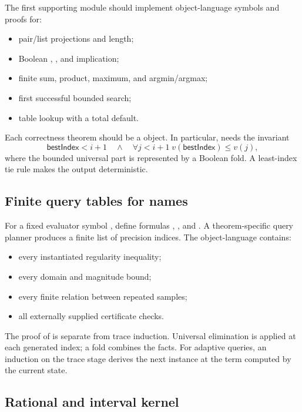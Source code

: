 The first supporting module should implement object-language symbols and
proofs for:
\begin{itemize}
\item pair/list projections and length;
\item Boolean , , and implication;
\item finite sum, product, maximum, and argmin/argmax;
\item first successful bounded search;
\item table lookup with a total default.
\end{itemize}

Each correctness theorem should be a  object.  In particular,
 needs the invariant
\[
 \mathsf{bestIndex}<i+1\quad\wedge\quad
 \forall j<i+1\;v(\mathsf{bestIndex})\le v(j),
\]
where the bounded universal part is represented by a Boolean fold.  A
least-index tie rule makes the output deterministic.

\subsection{Finite query tables for names}

For a fixed evaluator symbol , define formulas
, , and .  A theorem-specific query
planner produces a finite list of precision indices.  The object-language
 contains:

\begin{itemize}
\item every instantiated regularity inequality;
\item every domain and magnitude bound;
\item every finite relation between repeated samples;
\item all externally supplied certificate checks.
\end{itemize}

The proof of  is separate from trace induction.
Universal elimination is applied at each generated index; a fold combines the
facts.  For adaptive queries, an induction on the trace stage derives the next
instance at the term computed by the current state.

\subsection{Rational and interval kernel}

